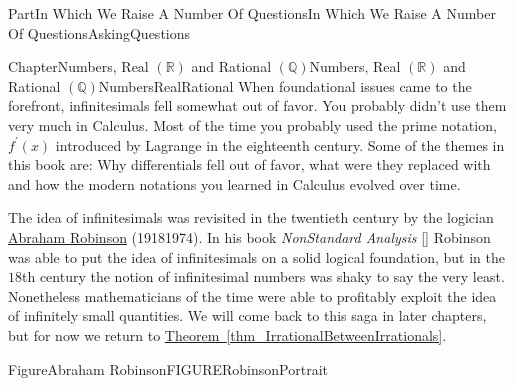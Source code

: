 \documentclass[oneside,10pt,]{book}
\newcommand{\xreffont}{\relax}
\newcommand{\pubtitle}[1]{\textsl{#1}}
\numberwithin{equation}{part}
\newcommand{\RR}{\mathbb {R}}
\newcommand{\QQ}{\mathbb {Q}}
\begin{document}
\begin{partptx}{Part}{In Which We Raise A Number Of Questions}{}{In Which We Raise A Number Of Questions}{}{}{AskingQuestions}
\begin{chapterptx}{Chapter}{Numbers, Real \(\left(\RR\right)\) and Rational \(\left(\QQ\right)\)}{}{Numbers, Real \(\left(\RR\right)\) and Rational \(\left(\QQ\right)\)}{}{}{NumbersRealRational}
 When foundational issues came to the forefront, infinitesimals fell somewhat out of favor. You probably didn't use them very much in Calculus. Most of the time you probably used the prime notation, \(f^\prime(x)\) introduced by Lagrange in the eighteenth century. Some of the themes in this book are: Why differentials fell out of favor, what were they replaced with and how the modern notations you learned in Calculus evolved over time.%
\par
The idea of infinitesimals was revisited in the twentieth century by the logician \href{https://mathshistory.st-andrews.ac.uk/Biographies/Robinson/}{Abraham Robinson} (1918\textendash{}1974). In his book \pubtitle{Non\textendash{}Standard Analysis} \hyperlink{robinson74__non_stand_analy}{[{\xreffont 12}]} Robinson was able to put the idea of infinitesimals on a solid logical foundation, but in the \(18\)th century the notion of infinitesimal numbers was shaky to say the very least. Nonetheless mathematicians of the time were able to profitably exploit the idea of infinitely small quantities. We will come back to this saga in later chapters, but for now we return to \hyperref[thm_IrrationalBetweenIrrationals]{Theorem~{\xreffont\ref{thm_IrrationalBetweenIrrationals}}}.%
\begin{figureptx}{Figure}{Abraham Robinson}{FIGURERobinsonPortrait}{}%
\begin{image}{0.325}{0.35}{0.325}{}%

\end{image}
\end{figureptx}
\end{chapterptx}
\end{partptx}
\end{document}
